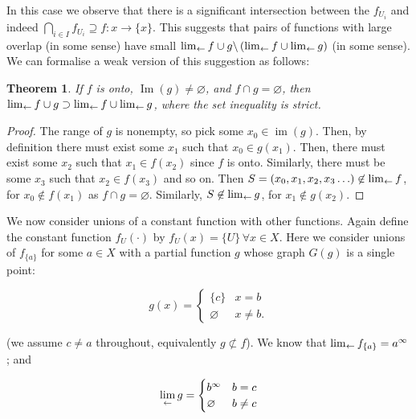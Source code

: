 \documentclass{article}
\newtheorem{thm}{Theorem}
\theoremstyle{definition}
\let\emptyset\varnothing
\begin{document}
In this case we observe that there is a significant intersection
between the $f_{U_i}$ and indeed $\bigcap_{i\in I}f_{U_i}\supseteq
f\colon x\longrightarrow\lbrace x\rbrace$.  This suggests that pairs
of functions with large overlap (in some sense) have small
$\lim_{\leftarrow} f\cup g\backslash\left(\lim_{\leftarrow} f\cup\lim_{\leftarrow} g\right)$ (in
some sense).  We can formalise a weak version of this suggestion as
follows:

\begin{thm}
If $f$ is onto, $\operatorname{Im}(g)\neq\emptyset$, and $f\cap
g=\emptyset$, then  $\lim_{\leftarrow} f\cup g\supset\lim_{\leftarrow} f\cup\lim_{\leftarrow} g$,
where the set inequality is strict.
\end{thm}

\begin{proof}
The range of $g$ is nonempty, so pick some
$x_0\in\operatorname{im}(g)$.  Then, by definition there must exist
some $x_1$ such that $x_0 \in g(x_1)$.  Then, there must exist some
$x_2$ such that $x_1\in f(x_2)$ since $f$ is onto.  Similarly, there
must be some $x_3$ such that $x_2\in f(x_3)$ and so on.  Then $S=(x_0,
x_1, x_2, x_3\ldots)\not\in\lim_{\leftarrow} f$, for $x_0\not\in f(x_1)$ as
$f\cap g=\emptyset$.  Similarly, $S\not\in\lim_{\leftarrow} g$, for $x_1\not\in
g(x_2)$.
\end{proof}

We now consider unions of a constant function with other functions.
Again define the constant function $f_{U}(\cdot)$ by $f_U(x)=\lbrace
U\rbrace\,\forall x\in X$.  Here we consider unions of $f_{\lbrace
  a\rbrace}$ for some $a\in X$ with a partial function $g$ whose graph
$G(g)$ is a single point:

\begin{equation}
  g(x) = \begin{cases}
    \lbrace c\rbrace & x=b\\
    \emptyset & x\neq b.
    \end{cases}
\end{equation}

(we assume $c\neq a$ throughout, equivalently $g\not\subset f$).  We
know that $\lim_{\leftarrow} f_{\lbrace a\rbrace}=a^\infty$; and

\begin{equation}
  \invlim{g}=\begin{cases}
  b^\infty & b=c\\
  \emptyset &b\neq c
  \end{cases}
\end{equation}
\end{document}
